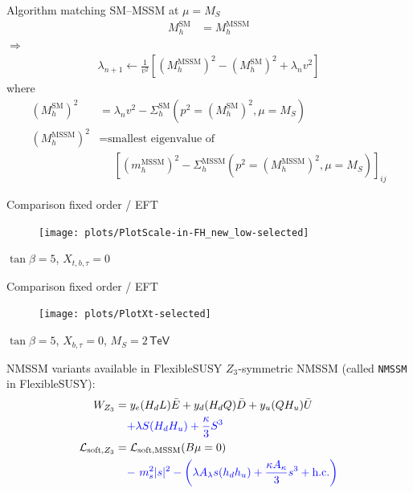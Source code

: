 \documentclass[hyperref={pdfpagelabels=false},ngerman]{beamer}
\newcommand{\eh}[1]{\,\mathsf{#1}}
\newcommand{\Lagr}{\mathcal{L}}
\newcommand{\SM}{\ensuremath{\text{SM}}}
\begin{document}

\begin{frame}{Algorithm matching SM--MSSM at $\mu = M_S$}
  \begin{align*}
    M_h^{\SM} &= M_h^\text{MSSM}
  \end{align*}
  $\Rightarrow$
  \begin{align*}
    \lambda_{n+1} \leftarrow \frac{1}{v^2} \left[ (M_h^\text{MSSM})^2 - (M_h^{\SM})^2 + \lambda_n v^2 \right]
  \end{align*}
  where
  \begin{align*}
    (M_h^{\SM})^2 &= \lambda_n v^2 - \Sigma^{\SM}_h(p^2 = (M_h^{\SM})^2,\mu = M_S) \\
    (M_h^\text{MSSM})^2 &= \text{smallest eigenvalue of} \\
    &\phantom{={}} \left[(m_h^\text{MSSM})^2 - \Sigma^\text{MSSM}_h(p^2 = (M_h^\text{MSSM})^2,\mu = M_S)\right]_{ij}
  \end{align*}
\end{frame}


\begin{frame}{Comparison fixed order / EFT}
  \begin{figure}
    \centering
    \texttt{[image: plots/PlotScale-in-FH\_new\_low-selected]}
  \end{figure}
  $\tan\beta = 5$, $X_{t,b,\tau} = 0$
\end{frame}


\begin{frame}{Comparison fixed order / EFT}
  \begin{figure}
    \centering
    \texttt{[image: plots/PlotXt-selected]}
  \end{figure}
  $\tan\beta = 5$, $X_{b,\tau} = 0$, $M_S = 2\eh{TeV}$
\end{frame}


\begin{frame}{NMSSM variants available in FlexibleSUSY}
  $Z_3$-symmetric NMSSM (called \texttt{NMSSM} in FlexibleSUSY):
  \begin{align*} 
    W_{Z_3} &= y_e (H_d L) \bar{E}
      + y_d (H_d Q) \bar{D}
      + y_u (Q H_u) \bar{U}\\
      &\phantom{={}}
      \textcolor{blue}{+ \lambda S (H_d H_u) + \frac{\kappa}{3}S^{3}} \\
    \Lagr_{\text{soft},Z_3} &= \Lagr_\text{soft,MSSM}(B\mu=0)\\
    &\phantom{={}}
    \textcolor{blue}{ -\ m_s^2|s|^2 
      -\left(\lambda A_\lambda s (h_d h_u)
        + \frac{\kappa A_\kappa}{3} s^3 + \text{h.c.}\right)}
  \end{align*}
\end{frame}
\end{document}
